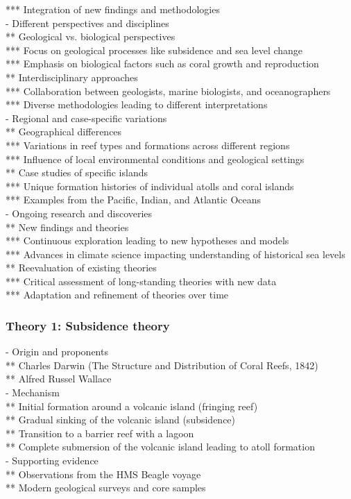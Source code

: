 *** Integration of new findings and methodologies \\
- Different perspectives and disciplines \\
** Geological vs. biological perspectives \\
*** Focus on geological processes like subsidence and sea level change \\
*** Emphasis on biological factors such as coral growth and reproduction \\
** Interdisciplinary approaches \\
*** Collaboration between geologists, marine biologists, and oceanographers \\
*** Diverse methodologies leading to different interpretations \\
- Regional and case-specific variations \\
** Geographical differences \\
*** Variations in reef types and formations across different regions \\
*** Influence of local environmental conditions and geological settings \\
** Case studies of specific islands \\
*** Unique formation histories of individual atolls and coral islands \\
*** Examples from the Pacific, Indian, and Atlantic Oceans \\
- Ongoing research and discoveries \\
** New findings and theories \\
*** Continuous exploration leading to new hypotheses and models \\
*** Advances in climate science impacting understanding of historical sea levels \\
** Reevaluation of existing theories \\
*** Critical assessment of long-standing theories with new data \\
*** Adaptation and refinement of theories over time

\subsubsection{Theory 1: Subsidence theory}
- Origin and proponents \\
** Charles Darwin (The Structure and Distribution of Coral Reefs, 1842) \\
** Alfred Russel Wallace \\
- Mechanism \\
** Initial formation around a volcanic island (fringing reef) \\
** Gradual sinking of the volcanic island (subsidence) \\
** Transition to a barrier reef with a lagoon \\
** Complete submersion of the volcanic island leading to atoll formation \\
- Supporting evidence \\
** Observations from the HMS Beagle voyage \\
** Modern geological surveys and core samples

